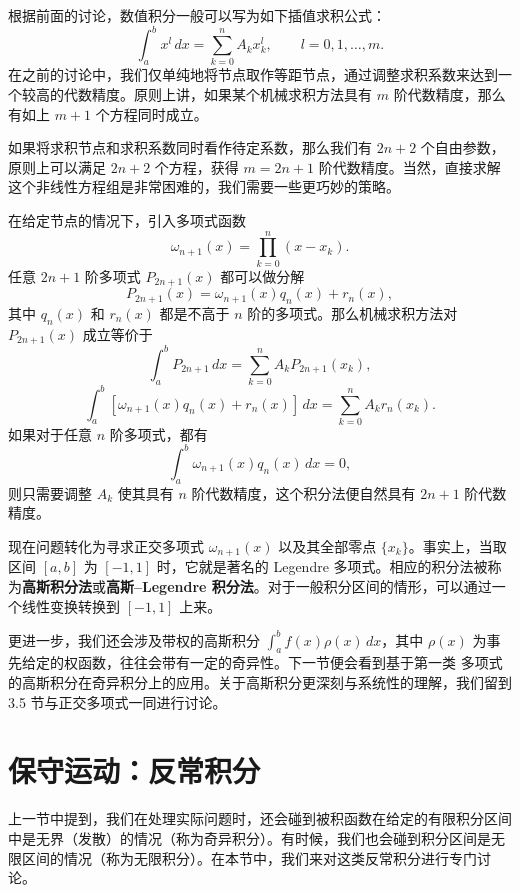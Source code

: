 根据前面的讨论，数值积分一般可以写为如下插值求积公式：
\begin{equation}
\int_a^b x^l\,dx=\sum_{k=0}^{n}A_kx_k^l,\qquad l=0,1,\ldots,m.
\tag{2.2.17}
\end{equation}
在之前的讨论中，我们仅单纯地将节点取作等距节点，通过调整求积系数来达到一个较高的代数精度。原则上讲，如果某个机械求积方法具有 $m$ 阶代数精度，那么有如上 $m+1$ 个方程同时成立。

如果将求积节点和求积系数同时看作待定系数，那么我们有 $2n+2$ 个自由参数，原则上可以满足 $2n+2$ 个方程，获得 $m=2n+1$ 阶代数精度。当然，直接求解这个非线性方程组是非常困难的，我们需要一些更巧妙的策略。

在给定节点的情况下，引入多项式函数
\[
\omega_{n+1}(x)=\prod_{k=0}^{n}(x-x_k).
\]
任意 $2n+1$ 阶多项式 $P_{2n+1}(x)$ 都可以做分解
\begin{equation}
P_{2n+1}(x)=\omega_{n+1}(x)q_n(x)+r_n(x),
\tag{2.2.18}
\end{equation}
其中 $q_n(x)$ 和 $r_n(x)$ 都是不高于 $n$ 阶的多项式。那么机械求积方法对 $P_{2n+1}(x)$ 成立等价于
\begin{equation}
\int_a^bP_{2n+1}\,dx=\sum_{k=0}^{n}A_kP_{2n+1}(x_k),
\tag{2.2.19}
\end{equation}
\begin{equation}
\int_a^b[\omega_{n+1}(x)q_n(x)+r_n(x)]\,dx=\sum_{k=0}^{n}A_kr_n(x_k).
\tag{2.2.20}
\end{equation}
如果对于任意 $n$ 阶多项式，都有
\[
\int_a^b\omega_{n+1}(x)q_n(x)\,dx=0,
\]
则只需要调整 $A_k$ 使其具有 $n$ 阶代数精度，这个积分法便自然具有 $2n+1$ 阶代数精度。

现在问题转化为寻求正交多项式 $\omega_{n+1}(x)$ 以及其全部零点 $\{x_k\}$。事实上，当取区间 $[a,b]$ 为 $[-1,1]$ 时，它就是著名的 Legendre 多项式。相应的积分法被称为\textbf{高斯积分法}或\textbf{高斯--Legendre 积分法}。对于一般积分区间的情形，可以通过一个线性变换转换到 $[-1,1]$ 上来。

更进一步，我们还会涉及带权的高斯积分 $\int_a^b f(x)\rho(x)\,dx$，其中 $\rho(x)$ 为事先给定的权函数，往往会带有一定的奇异性。下一节便会看到基于第一类 \ChebName{} 多项式的高斯积分在奇异积分上的应用。关于高斯积分更深刻与系统性的理解，我们留到 3.5 节与正交多项式一同进行讨论。

\section{保守运动：反常积分}

上一节中提到，我们在处理实际问题时，还会碰到被积函数在给定的有限积分区间中是无界（发散）的情况（称为奇异积分）。有时候，我们也会碰到积分区间是无限区间的情况（称为无限积分）。在本节中，我们来对这类反常积分进行专门讨论。

